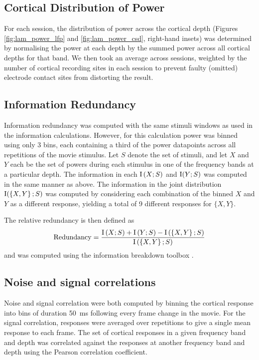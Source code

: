 \subsection{Cortical Distribution of Power}

For each session, the distribution of power across the cortical depth (Figures \ref{fig:lam_power_lfp} and \ref{fig:lam_power_csd}, right-hand insets) was determined by normalising the power at each depth by the summed power across all cortical depths for that band.
We then took an average across sessions, weighted by the number of cortical recording sites in each session to prevent faulty (omitted) electrode contact sites from distorting the result.


\subsection{Information Redundancy}

Information redundancy was computed with the same stimuli windows as used in the information calculations.
However, for this calculation power was binned using only \num{3} bins, each containing a third of the power datapoints across all repetitions of the movie stimulus.
Let $S$ denote the set of stimuli, and let $X$ and $Y$ each be the set of powers during each stimulus in one of the frequency bands at a particular depth.
The information in each $\operatorname{I}\left(X;S\right)$ and $\operatorname{I}(Y;S)$ was computed in the same manner as above.
The information in the joint distribution $\operatorname{I}(\left\{X,Y\right\};S)$ was computed by considering each combination of the binned $X$ and $Y$ as a different response, yielding a total of \num{9} different responses for $\{X,Y\}$.

The relative redundancy is then defined as
\begin{equation*}
\operatorname{Redundancy}=\frac{\operatorname{I}\left(X;S\right)+\operatorname{I}\left(Y;S\right)-\operatorname{I}\left(\left\{X,Y\right\};S\right)}{\operatorname{I}\left(\left\{X,Y\right\};S\right)}
\end{equation*}
and was computed using the information breakdown toolbox \citep{Magri2009}.


\subsection{Noise and signal correlations}

Noise and signal correlation were both computed by binning the cortical response into bins of duration \SI{50}{\milli\second} following every frame change in the movie.
For the signal correlation, responses were averaged over repetitions to give a single mean response to each frame.
The set of cortical responses in a given frequency band and depth was correlated against the responses at another frequency band and depth using the Pearson correlation coefficient.

